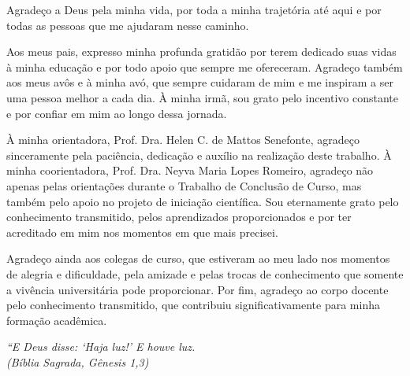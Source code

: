\documentclass[
	12pt,				%
	openright,			%
	oneside,			%
	a4paper,			%
	tcc,			%
	]{ABNT-DC-UEL}
\begin{document}
\begin{agradecimentos}

Agradeço a Deus pela minha vida, por toda a minha trajetória até aqui e por todas as pessoas que me ajudaram nesse caminho.

Aos meus pais, expresso minha profunda gratidão por terem dedicado suas vidas à minha educação e por todo apoio que sempre me ofereceram. Agradeço também aos meus avôs e à minha avó, que sempre cuidaram de mim e me inspiram a ser uma pessoa melhor a cada dia. À minha irmã, sou grato pelo incentivo constante e por confiar em mim ao longo dessa jornada.

À minha orientadora, Prof. Dra. Helen C. de Mattos Senefonte, agradeço sinceramente pela paciência, dedicação e auxílio na realização deste trabalho. À minha coorientadora, Prof. Dra. Neyva Maria Lopes Romeiro, agradeço não apenas pelas orientações durante o Trabalho de Conclusão de Curso, mas também pelo apoio no projeto de iniciação científica. Sou eternamente grato pelo conhecimento transmitido, pelos aprendizados proporcionados e por ter acreditado em mim nos momentos em que mais precisei.

Agradeço ainda aos colegas de curso, que estiveram ao meu lado nos momentos de alegria e dificuldade, pela amizade e pelas trocas de conhecimento que somente a vivência universitária pode proporcionar. Por fim, agradeço ao corpo docente pelo conhecimento transmitido, que contribuiu significativamente para minha formação acadêmica.

\end{agradecimentos}

\begin{epigrafe}
  \vspace*{\fill}
  \hspace{.4\textwidth}
  \begin{minipage}{.5\textwidth}   
    \begin{flushright}
	\textit{
    ``E Deus disse: `Haja luz!' E houve luz.\\
    (Bíblia Sagrada, Gênesis 1,3)}
    \end{flushright}
  \end{minipage}
\end{epigrafe}

\end{document}
